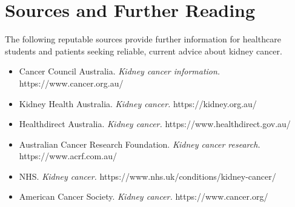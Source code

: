 \section*{Sources and Further Reading}
The following reputable sources provide further information for healthcare students and patients seeking reliable, current advice about kidney cancer.
\begin{itemize}
    \item Cancer Council Australia. \textit{Kidney cancer information.} https://www.cancer.org.au/
    \item Kidney Health Australia. \textit{Kidney cancer.} https://kidney.org.au/
    \item Healthdirect Australia. \textit{Kidney cancer.} https://www.healthdirect.gov.au/
    \item Australian Cancer Research Foundation. \textit{Kidney cancer research.} https://www.acrf.com.au/
    \item NHS. \textit{Kidney cancer.} https://www.nhs.uk/conditions/kidney-cancer/
    \item American Cancer Society. \textit{Kidney cancer.} https://www.cancer.org/
\end{itemize}
